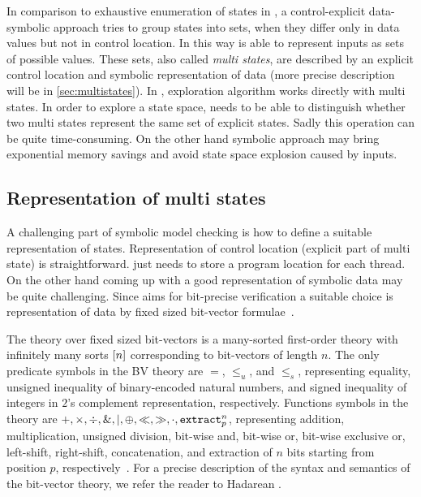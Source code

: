 In comparison to exhaustive enumeration of states in \DIVINE, a control-explicit
data-symbolic approach tries to group states into sets, when they differ only in
data values but not in control location. In this way \SymDIVINE is able to
represent inputs as sets of possible values. These sets, also called \emph{multi
states}, are described by an explicit control location and symbolic
representation of data (more precise description will be in
\autoref{sec:multistates}). In \SymDIVINE, exploration algorithm works directly
with multi states. In order to explore a state space, \SymDIVINE needs to be
able to distinguish whether two multi states represent the same set of explicit
states. Sadly this operation can be quite time-consuming. On the other hand
symbolic approach may bring exponential memory savings and avoid state space
explosion caused by inputs.

\subsection{Representation of multi states} \label{sec:multistates}

A challenging part of symbolic model checking is how to define a suitable
representation of states. Representation of control location (explicit part of
multi state) is straightforward. \SymDIVINE just needs to store
a program location for each thread. On the other hand coming up with a good
representation of symbolic data may be quite challenging. Since \SymDIVINE aims
for bit-precise verification a suitable choice is representation of data
by fixed sized bit-vector formulae~\cite{Bauch14}.

The theory over fixed sized bit-vectors is a many-sorted first-order theory with
infinitely many sorts $[n]$ corresponding to bit-vectors of length $n$. The
only predicate symbols in the BV theory are $=$, $\leq_u$, and $\leq_s$,
representing equality, unsigned inequality of binary-encoded natural numbers,
and signed inequality of integers in $2$'s complement representation,
respectively. Functions symbols in the theory are $+, \times, \div, \&, \mid,
\oplus, \ll, \gg, \cdot, \texttt{extract}^{n}_{p}$, representing addition, multiplication,
unsigned division, bit-wise and, bit-wise or, bit-wise exclusive or, left-shift,
right-shift, concatenation, and extraction of $n$ bits starting from position
$p$, respectively~\cite{Jonas17}. For a precise description of the syntax and
semantics of the bit-vector theory, we refer the reader to Hadarean
\cite{Hadarean14}.

